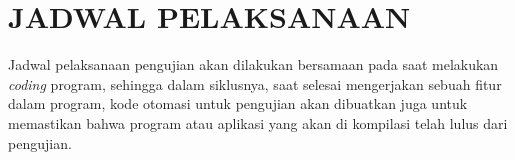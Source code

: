\chapter{JADWAL PELAKSANAAN}

Jadwal pelaksanaan pengujian akan dilakukan bersamaan pada saat melakukan \textit{coding} program, sehingga dalam siklusnya, saat selesai mengerjakan sebuah fitur dalam program, kode otomasi untuk pengujian akan dibuatkan juga untuk memastikan bahwa program atau aplikasi yang akan di kompilasi telah lulus dari pengujian.